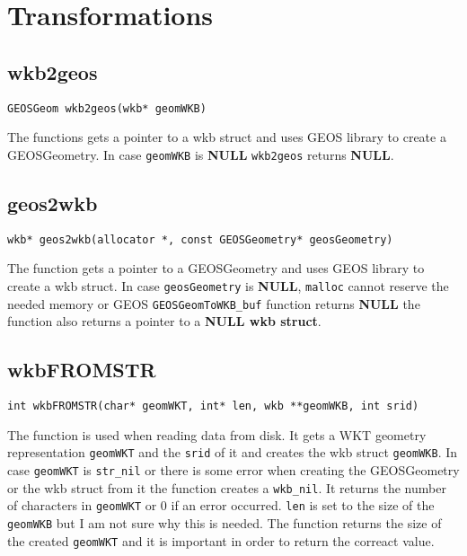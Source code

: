 \documentclass{article}
\begin{document}
\tableofcontents

\section{Transformations}

\subsection{wkb2geos}

{\tt GEOSGeom wkb2geos(wkb* geomWKB) }

\vspace{10pt}

\noindent
The functions gets a pointer to a wkb struct and uses GEOS library to create a 
GEOSGeometry. In case {\tt geomWKB} is {\bf NULL} {\tt wkb2geos} returns {\bf NULL}.


\subsection{geos2wkb}

{\tt wkb* geos2wkb(allocator *, const GEOSGeometry* geosGeometry)}

\vspace{10pt}

\noindent
The function gets a pointer to a GEOSGeometry and uses GEOS library to create a wkb struct.
In case {\tt geosGeometry} is {\bf NULL}, {\tt malloc} cannot reserve the needed memory 
or GEOS {\tt GEOSGeomToWKB\_buf} function returns {\bf NULL} the function also returns a pointer
to a {\bf NULL wkb struct}. 


\subsection{wkbFROMSTR}

{\tt int wkbFROMSTR(char* geomWKT, int* len, wkb **geomWKB, int srid)}

\vspace{10pt}

\noindent
The function is used when reading data from disk. It gets a WKT geometry representation 
{\tt geomWKT} and the {\tt srid} of it and creates the wkb struct {\tt geomWKB}. In case 
{\tt geomWKT} is {\tt str\_nil} or there is some error when creating the GEOSGeometry or 
the wkb struct from it the function creates a {\tt wkb\_nil}. It returns the number of 
characters in {\tt geomWKT} or 0 if an error occurred. {\tt *len} is set to the size of the  
{\tt geomWKB} but I am not sure why this is needed. The function returns the size of the created 
{\tt geomWKT} and it is important in order to return the correact value.
\end{document}
